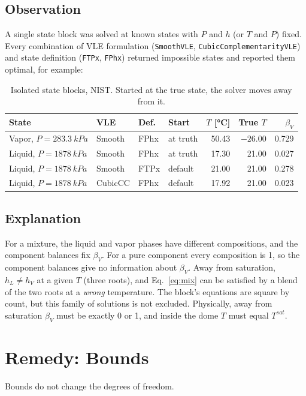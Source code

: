 \documentclass{article}
\begin{document}
\subsection{Observation}
A single state block was solved at known states with $P$ and $h$ (or $T$ and
$P$) fixed. Every combination of VLE formulation (\texttt{SmoothVLE},
\texttt{CubicComplementarityVLE}) and state definition (\texttt{FTPx},
\texttt{FPhx}) returned impossible states and reported them optimal, for
example:
\begin{table}[h]
\centering
\begin{tabular}{llllrrr}
\toprule
State & VLE & Def. & Start & $T$ [\si{\celsius}] & True $T$ & $\beta_V$ \\
\midrule
Vapor, $P=\SI{283.3}{kPa}$ & Smooth & FPhx & at truth & 50.43 & $-26.00$ & 0.729 \\
Liquid, $P=\SI{1878}{kPa}$ & Smooth & FPhx & at truth & 17.30 & 21.00 & 0.027 \\
Liquid, $P=\SI{1878}{kPa}$ & Smooth & FTPx & default & 21.00 & 21.00 & 0.278 \\
Liquid, $P=\SI{1878}{kPa}$ & CubicCC & FPhx & default & 17.92 & 21.00 & 0.023 \\
\bottomrule
\end{tabular}
\caption{Isolated state blocks, NIST. Started at the true state, the solver
moves away from it.}
\end{table}

\subsection{Explanation}
For a mixture, the liquid and vapor phases have different compositions, and
the component balances fix $\beta_V$. For a pure component every composition
is 1, so the component balances give no information about $\beta_V$. Away
from saturation, $h_L \neq h_V$ at a given $T$ (three roots), and
Eq.~\eqref{eq:mix} can be satisfied by a blend of the two roots at a
\emph{wrong} temperature. The block's equations are square by count, but this
family of solutions is not excluded. Physically, away from saturation
$\beta_V$ must be exactly 0 or 1, and inside the dome $T$ must equal
$T^{sat}$.

\section{Remedy: Bounds}
Bounds do not change the degrees of freedom.
\end{document}
